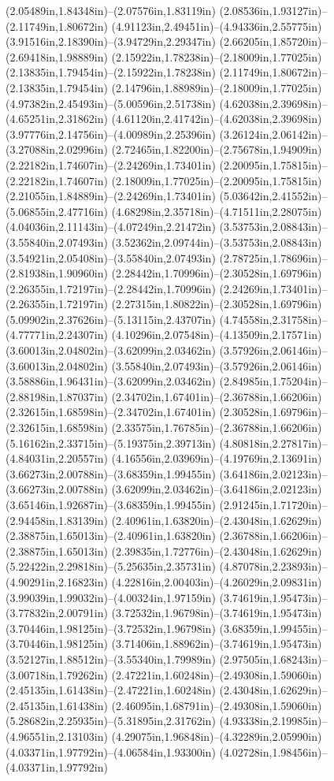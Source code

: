 (2.05489in,1.84348in)--(2.07576in,1.83119in) (2.08536in,1.93127in)--(2.11749in,1.80672in) (4.91123in,2.49451in)--(4.94336in,2.55775in) (3.91516in,2.18390in)--(3.94729in,2.29347in) (2.66205in,1.85720in)--(2.69418in,1.98889in) (2.15922in,1.78238in)--(2.18009in,1.77025in) (2.13835in,1.79454in)--(2.15922in,1.78238in) (2.11749in,1.80672in)--(2.13835in,1.79454in) (2.14796in,1.88989in)--(2.18009in,1.77025in) (4.97382in,2.45493in)--(5.00596in,2.51738in) (4.62038in,2.39698in)--(4.65251in,2.31862in) (4.61120in,2.41742in)--(4.62038in,2.39698in) (3.97776in,2.14756in)--(4.00989in,2.25396in) (3.26124in,2.06142in)--(3.27088in,2.02996in) (2.72465in,1.82200in)--(2.75678in,1.94909in) (2.22182in,1.74607in)--(2.24269in,1.73401in) (2.20095in,1.75815in)--(2.22182in,1.74607in) (2.18009in,1.77025in)--(2.20095in,1.75815in) (2.21055in,1.84889in)--(2.24269in,1.73401in) (5.03642in,2.41552in)--(5.06855in,2.47716in) (4.68298in,2.35718in)--(4.71511in,2.28075in) (4.04036in,2.11143in)--(4.07249in,2.21472in) (3.53753in,2.08843in)--(3.55840in,2.07493in) (3.52362in,2.09744in)--(3.53753in,2.08843in) (3.54921in,2.05408in)--(3.55840in,2.07493in) (2.78725in,1.78696in)--(2.81938in,1.90960in) (2.28442in,1.70996in)--(2.30528in,1.69796in) (2.26355in,1.72197in)--(2.28442in,1.70996in) (2.24269in,1.73401in)--(2.26355in,1.72197in) (2.27315in,1.80822in)--(2.30528in,1.69796in) (5.09902in,2.37626in)--(5.13115in,2.43707in) (4.74558in,2.31758in)--(4.77771in,2.24307in) (4.10296in,2.07548in)--(4.13509in,2.17571in) (3.60013in,2.04802in)--(3.62099in,2.03462in) (3.57926in,2.06146in)--(3.60013in,2.04802in) (3.55840in,2.07493in)--(3.57926in,2.06146in) (3.58886in,1.96431in)--(3.62099in,2.03462in) (2.84985in,1.75204in)--(2.88198in,1.87037in) (2.34702in,1.67401in)--(2.36788in,1.66206in) (2.32615in,1.68598in)--(2.34702in,1.67401in) (2.30528in,1.69796in)--(2.32615in,1.68598in) (2.33575in,1.76785in)--(2.36788in,1.66206in) (5.16162in,2.33715in)--(5.19375in,2.39713in) (4.80818in,2.27817in)--(4.84031in,2.20557in) (4.16556in,2.03969in)--(4.19769in,2.13691in) (3.66273in,2.00788in)--(3.68359in,1.99455in) (3.64186in,2.02123in)--(3.66273in,2.00788in) (3.62099in,2.03462in)--(3.64186in,2.02123in) (3.65146in,1.92687in)--(3.68359in,1.99455in) (2.91245in,1.71720in)--(2.94458in,1.83139in) (2.40961in,1.63820in)--(2.43048in,1.62629in) (2.38875in,1.65013in)--(2.40961in,1.63820in) (2.36788in,1.66206in)--(2.38875in,1.65013in) (2.39835in,1.72776in)--(2.43048in,1.62629in) (5.22422in,2.29818in)--(5.25635in,2.35731in) (4.87078in,2.23893in)--(4.90291in,2.16823in) (4.22816in,2.00403in)--(4.26029in,2.09831in) (3.99039in,1.99032in)--(4.00324in,1.97159in) (3.74619in,1.95473in)--(3.77832in,2.00791in) (3.72532in,1.96798in)--(3.74619in,1.95473in) (3.70446in,1.98125in)--(3.72532in,1.96798in) (3.68359in,1.99455in)--(3.70446in,1.98125in) (3.71406in,1.88962in)--(3.74619in,1.95473in) (3.52127in,1.88512in)--(3.55340in,1.79989in) (2.97505in,1.68243in)--(3.00718in,1.79262in) (2.47221in,1.60248in)--(2.49308in,1.59060in) (2.45135in,1.61438in)--(2.47221in,1.60248in) (2.43048in,1.62629in)--(2.45135in,1.61438in) (2.46095in,1.68791in)--(2.49308in,1.59060in) (5.28682in,2.25935in)--(5.31895in,2.31762in) (4.93338in,2.19985in)--(4.96551in,2.13103in) (4.29075in,1.96848in)--(4.32289in,2.05990in) (4.03371in,1.97792in)--(4.06584in,1.93300in) (4.02728in,1.98456in)--(4.03371in,1.97792in) 